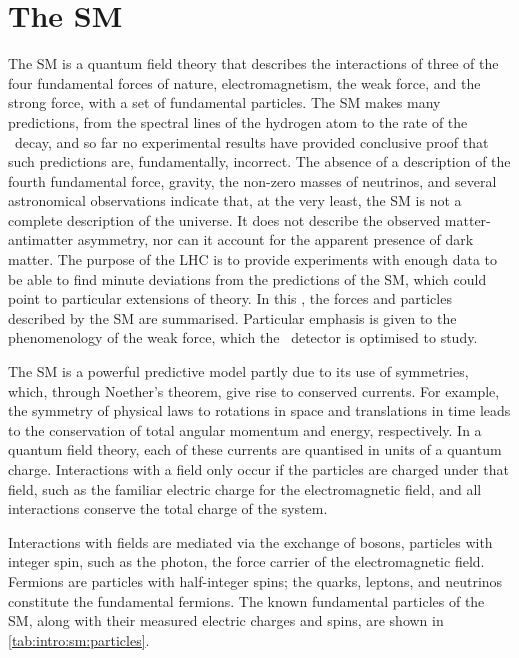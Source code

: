 \chapter{The \acl{SM}}
\label{chap:intro:sm}

The \acf{SM} is a quantum field theory that describes the interactions of three 
of the four fundamental forces of nature, electromagnetism, the weak force, and 
the strong force, with a set of fundamental particles.
The \ac{SM} makes many predictions, from the spectral lines of the hydrogen  
atom to the rate of the \BsTomumu\ decay, and so far no experimental results 
have provided conclusive proof that such predictions are, fundamentally, 
incorrect.
The absence of a description of the fourth fundamental force, gravity, the 
non-zero masses of neutrinos, and several astronomical observations indicate 
that, at the very least, the \ac{SM} is not a complete description of the 
universe.
It does not describe the observed matter-antimatter asymmetry, nor can it 
account for the apparent presence of dark matter.
The purpose of the \ac{LHC} is to provide experiments with enough data to be 
able to find minute deviations from the predictions of the \ac{SM}, which could 
point to particular extensions of theory.
In this , the forces and particles described by the 
\ac{SM} are summarised.
Particular emphasis is given to the phenomenology of the weak force, which the 
\lhcb\ detector is optimised to study.

The \ac{SM} is a powerful predictive model partly due to its use of symmetries, 
which, through Noether's theorem, give rise to conserved currents.
For example, the symmetry of physical laws to rotations in space and 
translations in time leads to the conservation of total angular momentum and 
energy, respectively.
In a quantum field theory, each of these currents are quantised in units of a 
quantum charge.
Interactions with a field only occur if the particles are charged under that 
field, such as the familiar electric charge for the electromagnetic field, and 
all interactions conserve the total charge of the system.

Interactions with fields are mediated via the exchange of bosons, particles 
with integer spin, such as the photon, the force carrier of the electromagnetic 
field.
Fermions are particles with half-integer spins; the quarks, leptons, and 
neutrinos constitute the fundamental fermions.
The known fundamental particles of the \ac{SM}, along with their measured 
electric charges and spins, are shown in \cref{tab:intro:sm:particles}.

